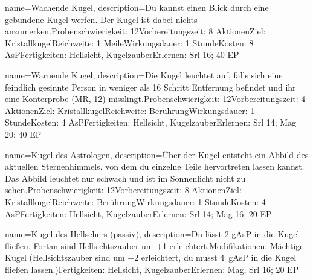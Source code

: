 {
    name={Wachende Kugel},
    description={Du kannst einen Blick durch eine gebundene Kugel werfen. Der Kugel ist dabei nichts anzumerken.\newline Probenschwierigkeit: 12\newline Vorbereitungszeit: 8 Aktionen\newline Ziel: Kristallkugel\newline Reichweite: 1 Meile\newline Wirkungsdauer: 1 Stunde\newline Kosten: 8 AsP\newline Fertigkeiten: Hellsicht, Kugelzauber\newline Erlernen: Srl 16; 40 EP}
}


{
    name={Warnende Kugel},
    description={Die Kugel leuchtet auf, falls sich eine feindlich gesinnte Person in weniger als 16 Schritt Entfernung befindet und ihr eine Konterprobe (MR, 12) misslingt.\newline Probenschwierigkeit: 12\newline Vorbereitungszeit: 4 Aktionen\newline Ziel: Kristallkugel\newline Reichweite: Berührung\newline Wirkungsdauer: 1 Stunde\newline Kosten: 4 AsP\newline Fertigkeiten: Hellsicht, Kugelzauber\newline Erlernen: Srl 14; Mag 20; 40 EP}
}


{
    name={Kugel des Astrologen},
    description={Über der Kugel entsteht ein Abbild des aktuellen Sternenhimmels, von dem du einzelne Teile hervortreten lassen kannst. Das Abbild leuchtet nur schwach und ist im Sonnenlicht nicht zu sehen.\newline Probenschwierigkeit: 12\newline Vorbereitungszeit: 8 Aktionen\newline Ziel: Kristallkugel\newline Reichweite: Berührung\newline Wirkungsdauer: 1 Stunde\newline Kosten: 4 AsP\newline Fertigkeiten: Hellsicht, Kugelzauber\newline Erlernen: Srl 14; Mag 16; 20 EP}
}


{
    name={Kugel des Hellsehers (passiv)},
    description={Du lässt 2 gAsP in die Kugel fließen. Fortan sind Hellsichtszauber um +1 erleichtert.\newline Modifikationen: Mächtige Kugel (Hellsichtszauber sind um +2 erleichtert, du musst 4 gAsP in die Kugel fließen lassen.)\newline Fertigkeiten: Hellsicht, Kugelzauber\newline Erlernen: Mag, Srl 16; 20 EP}
}



